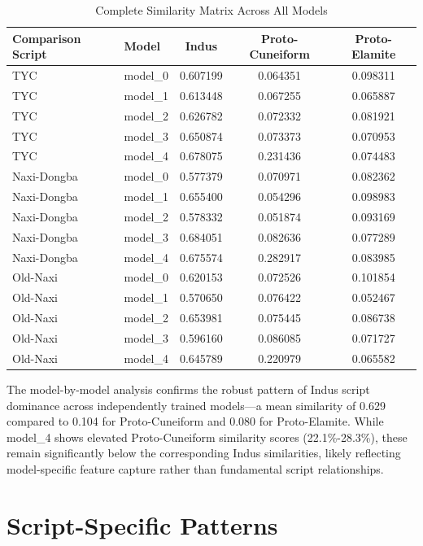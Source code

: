 \documentclass[11pt,a4paper,oneside]{report}
\begin{document}
\begin{table}[H]
\centering
\caption{Complete Similarity Matrix Across All Models}
\label{tab:complete_similarity}
\begin{tabular}{llccc}
\hline
\textbf{Comparison Script} & \textbf{Model} & \textbf{Indus} & \textbf{Proto-Cuneiform} & \textbf{Proto-Elamite} \\
\hline
TYC & model\_0 & 0.607199 & 0.064351 & 0.098311 \\
TYC & model\_1 & 0.613448 & 0.067255 & 0.065887 \\
TYC & model\_2 & 0.626782 & 0.072332 & 0.081921 \\
TYC & model\_3 & 0.650874 & 0.073373 & 0.070953 \\
TYC & model\_4 & 0.678075 & 0.231436 & 0.074483 \\
\hline
Naxi-Dongba & model\_0 & 0.577379 & 0.070971 & 0.082362 \\
Naxi-Dongba & model\_1 & 0.655400 & 0.054296 & 0.098983 \\
Naxi-Dongba & model\_2 & 0.578332 & 0.051874 & 0.093169 \\
Naxi-Dongba & model\_3 & 0.684051 & 0.082636 & 0.077289 \\
Naxi-Dongba & model\_4 & 0.675574 & 0.282917 & 0.083985 \\
\hline
Old-Naxi & model\_0 & 0.620153 & 0.072526 & 0.101854 \\
Old-Naxi & model\_1 & 0.570650 & 0.076422 & 0.052467 \\
Old-Naxi & model\_2 & 0.653981 & 0.075445 & 0.086738 \\
Old-Naxi & model\_3 & 0.596160 & 0.086085 & 0.071727 \\
Old-Naxi & model\_4 & 0.645789 & 0.220979 & 0.065582 \\
\hline
\end{tabular}
\end{table}

The model-by-model analysis confirms the robust pattern of Indus script dominance across independently trained models—a mean similarity of 0.629 compared to 0.104 for Proto-Cuneiform and 0.080 for Proto-Elamite. While model\_4 shows elevated Proto-Cuneiform similarity scores (22.1\%-28.3\%), these remain significantly below the corresponding Indus similarities, likely reflecting model-specific feature capture rather than fundamental script relationships.


\section{Script-Specific Patterns}
\end{document}
